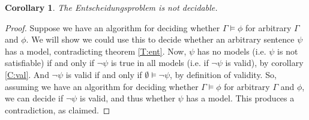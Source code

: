 \documentclass{article}
\theoremstyle{plain}
\newtheorem{corollary}[theorem]{Corollary}{\bfseries}{\upshape}
\theoremstyle{definition}
\begin{document}
\begin{corollary}
The Entscheidungsproblem is not decidable.
\end{corollary} 
\begin{proof}
Suppose we have an algorithm for deciding whether $\Gamma\models \phi$ for arbitrary $\Gamma$ and $\phi$. We will show we could use this to decide whether an arbitrary sentence $\psi$ has a model, contradicting theorem \ref{T:ent}. Now, $\psi$ has no models (i.e. $\psi$ is not satisfiable) if and only if $\neg \psi$ is true in all models (i.e. if $\neg \psi$ is valid), by corollary \ref{C:val}. And $\neg\psi$ is valid if and only if $\emptyset\models \neg\psi$, by definition of validity. So, assuming we have an algorithm for deciding whether $\Gamma\models \phi$ for arbitrary $\Gamma$ and $\phi$, we can decide if $\neg\psi$ is valid, and thus whether $\psi$ has a model. This produces a contradiction, as claimed.
\end{proof}
\end{document}
